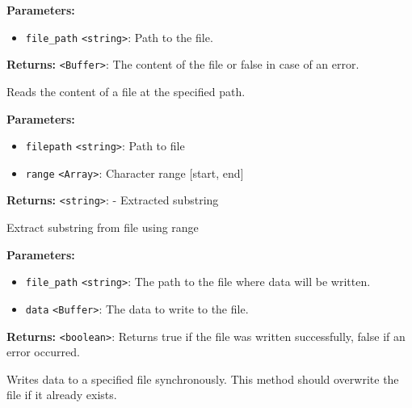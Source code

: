 \documentclass[12pt,a4paper]{article}
\begin{document}
\noindent \textbf{Parameters:}
\begin{itemize}
  \item \texttt{file\_path} \texttt{<string>}: Path to the file.
\end{itemize}

\noindent \textbf{Returns:} \texttt{<Buffer>}: The content of the file or false in case of an error.

\noindent Reads the content of a file at the specified path.

\vspace{5mm}
\noindent {}


\noindent \textbf{Parameters:}
\begin{itemize}
  \item \texttt{filepath} \texttt{<string>}: Path to file
  \item \texttt{range} \texttt{<Array>}: Character range [start, end]
\end{itemize}

\noindent \textbf{Returns:} \texttt{<string>}: - Extracted substring

\noindent Extract substring from file using range

\vspace{5mm}
\noindent {}


\noindent \textbf{Parameters:}
\begin{itemize}
  \item \texttt{file\_path} \texttt{<string>}: The path to the file where data will be written.
  \item \texttt{data} \texttt{<Buffer>}: The data to write to the file.
\end{itemize}

\noindent \textbf{Returns:} \texttt{<boolean>}: Returns true if the file was written successfully, false if an error occurred.

\noindent Writes data to a specified file synchronously. This method should overwrite the file if it already exists.

\vspace{5mm}
\noindent {}
\end{document}
